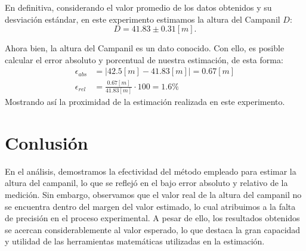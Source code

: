 \documentclass[10pt,a4paper]{article}
\begin{document}
\begin{multicols}{2}
En definitiva, considerando el valor promedio de los datos obtenidos y su desviación estándar, en este experimento estimamos la altura del Campanil $D$: $$D = 41.83 \pm 0.31 [m].$$

Ahora bien, la altura del Campanil es un dato conocido. Con ello, es posible calcular el error absoluto y porcentual de nuestra estimación, de esta forma:
\begin{align*}
\epsilon_{abs} &= |42.5[m] - 41.83[m]| = 0.67 [m]\\
\epsilon_{rel} &= \frac{0.67[m]}{41.83[m]}\cdot 100 = 1.6 \% 
\end{align*}
Mostrando así la proximidad de la estimación realizada en este experimento.
\section{Conlusión}
En el análisis, demostramos la efectividad del método empleado para estimar la altura del campanil, lo que se reflejó en el bajo error absoluto y relativo de la medición. Sin embargo, observamos que el valor real de la altura del campanil no se encuentra dentro del margen del valor estimado, lo cual atribuimos a la falta de precisión en el proceso experimental. A pesar de ello, los resultados obtenidos se acercan considerablemente al valor esperado, lo que destaca la gran capacidad y utilidad de las herramientas matemáticas utilizadas en la estimación.



		
	\end{multicols}
	
	
	
\end{document}
